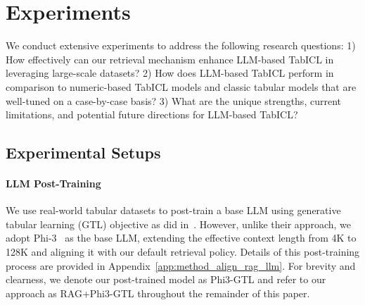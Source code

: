 \section{Experiments}
\label{sec:exp}

We conduct extensive experiments to address the following research questions:
1) How effectively can our retrieval mechanism enhance LLM-based TabICL in leveraging large-scale datasets?
2) How does LLM-based TabICL perform in comparison to numeric-based TabICL models and classic tabular models that are well-tuned on a case-by-case basis?
3) What are the unique strengths, current limitations, and potential future directions for LLM-based TabICL?




\subsection{Experimental Setups}
\label{sec:exp_setup}

\paragraph{LLM Post-Training}
We use real-world tabular datasets to post-train a base LLM using generative tabular learning (GTL) objective as did in~\citep{wen2024GTL}.
However, unlike their approach, we adopt Phi-3~\citep{abdin2024phi3} as the base LLM, extending the effective context length from 4K to 128K and aligning it with our default retrieval policy.
Details of this post-training process are provided in Appendix~\ref{app:method_align_rag_llm}. For brevity and clearness, we denote our post-trained model as Phi3-GTL and refer to our approach as RAG+Phi3-GTL throughout the remainder of this paper.

